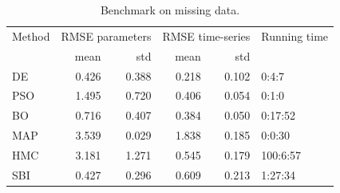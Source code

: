 \documentclass[preprint,11pt,authoryear]{elsarticle}
\begin{document}
\begin{table}[p]
    \centering
    \begin{tabular}{lrrrrl}
    {Method} & \multicolumn{2}{r}{RMSE parameters} & \multicolumn{2}{r}{RMSE time-series} & Running time \\
    {} &            mean &       std &             mean & std \\
    \midrule
    DE & 0.426 & 0.388 & 0.218 & 0.102 & 0:4:7 \\
    PSO & 1.495 & 0.720 & 0.406 & 0.054 & 0:1:0 \\
    BO & 0.716 & 0.407 & 0.384 & 0.050 & 0:17:52 \\
    MAP & 3.539 & 0.029 & 1.838 & 0.185 & 0:0:30 \\
    HMC & 3.181 & 1.271 & 0.545 & 0.179 & 100:6:57 \\
    SBI & 0.427 & 0.296 & 0.609 & 0.213 & 1:27:34 \\
    \end{tabular}
\caption{Benchmark on missing data. }
\label{tab:Missingdata}
\end{table}






\clearpage
\newpage



\end{document}
